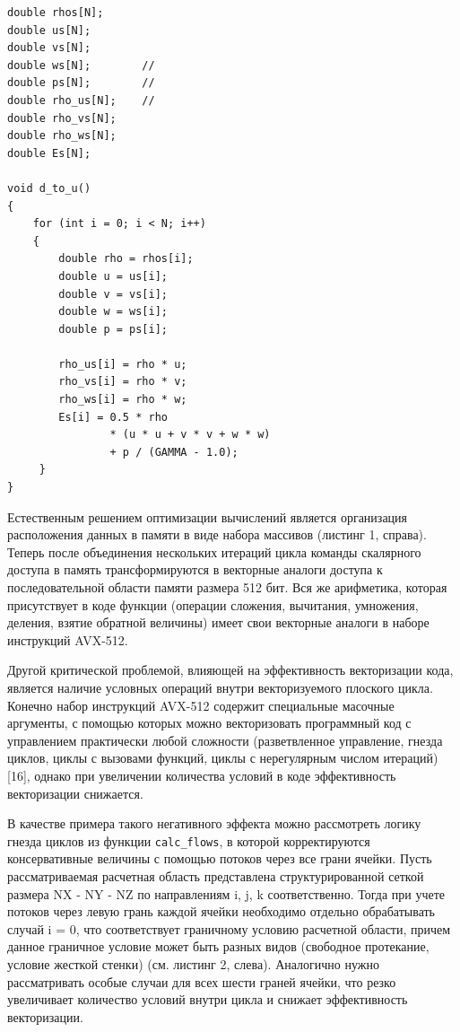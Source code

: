 \begin{lstlisting}[caption={caption},label={label}]
double rhos[N];
double us[N];
double vs[N];
double ws[N];        // 
double ps[N];        // 
double rho_us[N];    // 
double rho_vs[N];
double rho_ws[N];
double Es[N];

void d_to_u()
{
    for (int i = 0; i < N; i++)
    {
        double rho = rhos[i];
        double u = us[i];
        double v = vs[i];
        double w = ws[i];
        double p = ps[i];

        rho_us[i] = rho * u;
        rho_vs[i] = rho * v;
        rho_ws[i] = rho * w;
        Es[i] = 0.5 * rho
                * (u * u + v * v + w * w)
                + p / (GAMMA - 1.0);
     }
}
\end{lstlisting}

Естественным решением оптимизации вычислений является организация расположения данных в памяти в виде набора массивов (листинг 1, справа).
Теперь после объединения нескольких итераций цикла команды скалярного доступа в память трансформируются в векторные аналоги доступа к последовательной области памяти размера 512 бит.
Вся же арифметика, которая присутствует в коде функции (операции сложения, вычитания, умножения, деления, взятие обратной величины) имеет свои векторные аналоги в наборе инструкций AVX-512.

Другой критической проблемой, влияющей на эффективность векторизации кода, является наличие условных операций внутри векторизуемого плоского цикла.
Конечно набор инструкций AVX-512 содержит специальные масочные аргументы, с помощью которых можно векторизовать программный код с управлением практически любой сложности (разветвленное управление, гнезда циклов, циклы с вызовами функций, циклы с нерегулярным числом итераций) [16], однако при увеличении количества условий в коде эффективность векторизации снижается.

В качестве примера такого негативного эффекта можно рассмотреть логику гнезда циклов из функции \texttt{calc\_flows}, в которой корректируются консервативные величины с помощью потоков через все грани ячейки.
Пусть рассматриваемая расчетная область представлена структурированной сеткой размера NX - NY - NZ по направлениям i, j, k соответственно.
Тогда при учете потоков через левую грань каждой ячейки необходимо отдельно обрабатывать случай i = 0, что соответствует граничному условию расчетной области, причем данное граничное условие может быть разных видов (свободное протекание, условие жесткой стенки) (см. листинг 2, слева).
Аналогично нужно рассматривать особые случаи для всех шести граней ячейки, что резко увеличивает количество условий внутри цикла и снижает эффективность векторизации.

